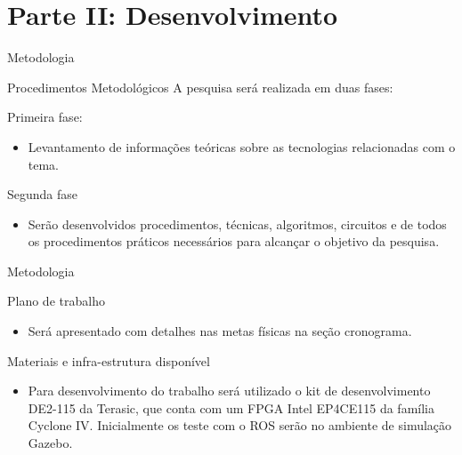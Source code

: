 \documentclass[10pt]{beamer}
\begin{document}




\section{Parte II: Desenvolvimento}

\begin{frame}{Metodologia}
    \begin{alertblock}{Procedimentos Metodológicos}
        A pesquisa será realizada em duas fases:
        \begin{block}{Primeira fase:}
            \begin{itemize}
                \item Levantamento de informações teóricas sobre as tecnologias relacionadas com o tema.
            \end{itemize}
        \end{block}
    
        \begin{block}{Segunda fase}
            \begin{itemize}
                \item Serão desenvolvidos procedimentos, técnicas, algoritmos, circuitos e de todos os procedimentos práticos necessários para alcançar o objetivo da pesquisa.
            \end{itemize}
        \end{block}
    \end{alertblock}

  
\end{frame}

{
\begin{frame}{Metodologia}
	\begin{alertblock}{Plano de trabalho}
	    \begin{itemize}
	        \item Será apresentado com detalhes nas metas físicas na seção cronograma.
	    \end{itemize}
	\end{alertblock}
	
	\begin{alertblock}{Materiais e infra-estrutura disponível}
	    \begin{itemize}
	        \item Para desenvolvimento do trabalho será utilizado o kit de desenvolvimento DE2-115
        da Terasic, que conta com um FPGA Intel EP4CE115 da família Cyclone IV. Inicialmente
        os teste com o ROS serão no ambiente de simulação Gazebo.
        \end{itemize}
	\end{alertblock}
	
\end{frame}
}
\end{document}
